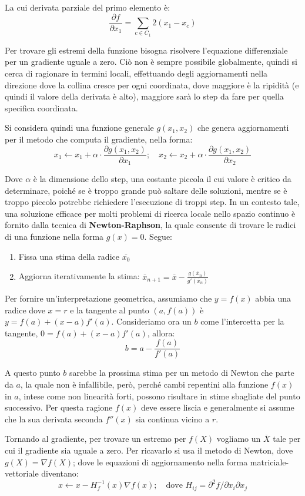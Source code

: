 \noindent La cui derivata parziale del primo elemento è: \[
	\frac{\partial f}{\partial x_1} = \sum_{c\in C_1} 2(x_1 - x_c)
\]

\noindent Per trovare gli estremi della funzione bisogna risolvere l'equazione differenziale per un gradiente uguale a zero. Ciò non è sempre possibile
globalmente, quindi si cerca di ragionare in termini locali, effettuando degli aggiornamenti nella direzione dove la collina cresce per ogni coordinata,
dove maggiore è la ripidità (e quindi il valore della derivata è alto), maggiore sarà lo step da fare per quella specifica coordinata.\par
Si considera quindi una funzione generale $g(x_1, x_2)$ che genera aggiornamenti per il metodo che computa il gradiente, nella forma: \[
	x_1\gets x_1+\alpha \cdot \frac{\partial g(x_1, x_2)}{\partial x_1};\quad x_2\gets x_2 + \alpha \cdot \frac{\partial g(x_1, x_2)}{\partial x_2}
\]

\noindent Dove $\alpha$ è la dimensione dello step, una costante piccola il cui valore è critico da determinare, poiché se è troppo grande può saltare
delle soluzioni, mentre se è troppo piccolo potrebbe richiedere l'esecuzione di troppi step. In un contesto tale, una soluzione efficace per molti
problemi di ricerca locale nello spazio continuo è fornito dalla tecnica di \textbf{Newton-Raphson}, la quale consente di trovare le radici di una
funzione nella forma $g(x) = 0$. Segue: \begin{enumerate}
	\item Fissa una stima della radice $\overline{x_0}$
	\item Aggiorna iterativamente la stima: $\overline{x}_{n+1} = \overline{x} - \frac{g(\overline{x}_n)}{g'(\overline{x}_n)}$
\end{enumerate}

\noindent Per fornire un'interpretazione geometrica, assumiamo che $y = f(x)$ abbia una radice dove $x=r$ e la tangente al punto $(a, f(a))$ è $y =
f(a) + (x-a)f'(a)$. Consideriamo ora un $b$ come l'intercetta per la tangente, $0 = f(a) + (x-a)f'(a)$, allora: \[
	b = a - \frac{f(a)}{f'(a)}
\]

\noindent A questo punto $b$ sarebbe la prossima stima per un metodo di Newton che parte da $a$, la quale non è infallibile, però, perché cambi
repentini alla funzione $f(x)$ in $a$, intese come non linearità forti, possono risultare in stime sbagliate del punto successivo. Per questa ragione
$f(x)$ deve essere liscia e generalmente si assume che la sua derivata seconda $f''(x)$ sia continua vicino a $r$.\par
Tornando al gradiente, per trovare un estremo per $f(X)$ vogliamo un $\overline{X}$ tale per cui il gradiente sia uguale a zero. Per ricavarlo si usa
il metodo di Newton, dove $g(X) = \nabla f(X)$; dove le equazioni di aggiornamento nella forma matriciale-vettoriale diventano: \[
    x\gets x - H_f^{-1}(x) \nabla f(x);\quad \text{dove } H_{ij} = \partial^2 f / \partial x_i \partial x_j
\]

